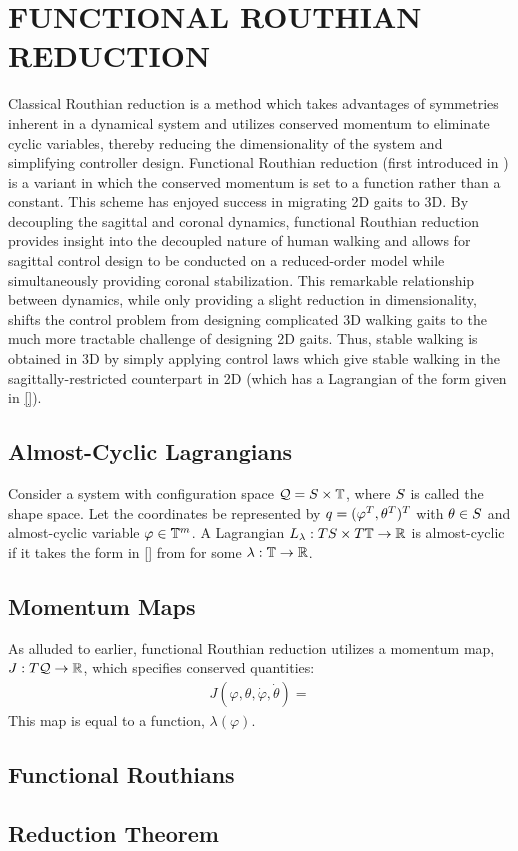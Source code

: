 \chapter{\uppercase{Functional Routhian Reduction}}

Classical Routhian reduction \cite{} is a method which takes advantages of symmetries inherent in a dynamical system and utilizes conserved momentum to eliminate cyclic variables, thereby reducing the dimensionality of the system and simplifying controller design. Functional Routhian reduction (first introduced in \cite{}) is a variant in which the conserved momentum is set to a function rather than a constant. This scheme has enjoyed success in migrating 2D gaits to 3D. By decoupling the sagittal and coronal dynamics, functional Routhian reduction provides insight into the decoupled nature of human walking and allows for sagittal control design to be conducted on a reduced-order model while simultaneously providing coronal stabilization. This remarkable relationship between dynamics, while only providing a slight reduction in dimensionality, shifts the control problem from designing complicated 3D walking gaits to the much more tractable challenge of designing 2D gaits. Thus, stable walking is obtained in 3D by simply applying control laws which give stable walking in the sagittally-restricted counterpart in 2D (which has a Lagrangian of the form given in \eqref{}).


\section{Almost-Cyclic Lagrangians}
Consider a system with configuration space $\mathcal{Q} = S \times \mathbb{T}$, where $S$ is called the shape space. Let the coordinates be represented by $q = (\varphi^T, \theta^T)^T$ with $\theta \in S$ and almost-cyclic variable $\varphi \in \mathbb{T}^{m}$. A Lagrangian $L_{\lambda} : TS \times T\mathbb{T} \to \mathbb{R}$ is almost-cyclic if it takes the form in \eqref{} from \cite{} for some $\lambda : \mathbb{T} \to \mathbb{R}$.

\section{Momentum Maps}
As alluded to earlier, functional Routhian reduction utilizes a momentum map, $J : T\mathcal{Q} \to \mathbb{R}$, which specifies conserved quantities:
\begin{align*}
  J(\varphi, \theta, \dot \varphi, \dot \theta) = 
\end{align*}
This map is equal to a function, $\lambda(\varphi)$.

\section{Functional Routhians}

\section{Reduction Theorem}
